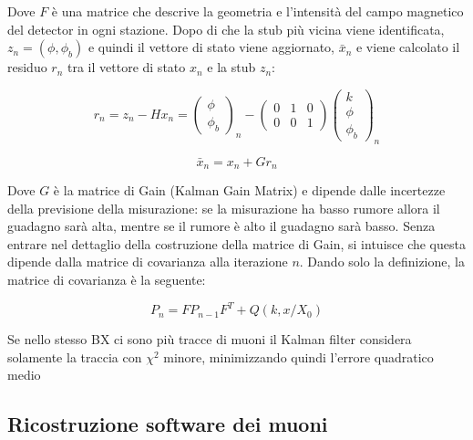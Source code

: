 Dove $F$ è una matrice che descrive la geometria e l'intensità del campo magnetico del detector in ogni stazione.
Dopo di che la stub più vicina viene identificata, $z_n = (\phi, \phi_b)$ e quindi il vettore di stato viene aggiornato, $\bar{x}_n$ e viene calcolato il residuo $r_n$ tra il vettore di stato $x_n$ e la stub $z_n$: 

\begin{equation}
  \label{eq:KalmanFilterEq2}
    r_n = z_n - Hx_n = \left( \begin{matrix}
      \phi \\
      \phi_b
    \end{matrix}\right)_n - \left( \begin{matrix}
      0 & 1 & 0 \\ 
      0 & 0 & 1
    \end{matrix}\right)
    \left(\begin{matrix}
      k \\
      \phi \\
      \phi_b
    \end{matrix}\right)_n
\end{equation}

\begin{equation}
  \label{eq:KalmanFilterEq3}
    \bar{x}_n = x_n + Gr_n
\end{equation}

Dove $G$ è la matrice di Gain (Kalman Gain Matrix) e dipende dalle incertezze della previsione della misurazione: se la misurazione ha basso rumore allora il guadagno sarà alta, mentre se il rumore è alto il guadagno sarà basso. Senza entrare nel dettaglio della costruzione della matrice di Gain, si intuisce che questa dipende dalla matrice di covarianza alla iterazione $n$. Dando solo la definizione, la matrice di covarianza è la seguente:

\begin{equation}
  \label{eq:covariance}
  P_n = FP_{n-1}F^T + Q(k, x/X_0)
\end{equation}

Se nello stesso BX ci sono più tracce di muoni il Kalman filter considera solamente la traccia con $\chi^2$ minore, minimizzando quindi l'errore quadratico medio \cite{Summers:2728522}

\subsection{Ricostruzione software dei muoni}

